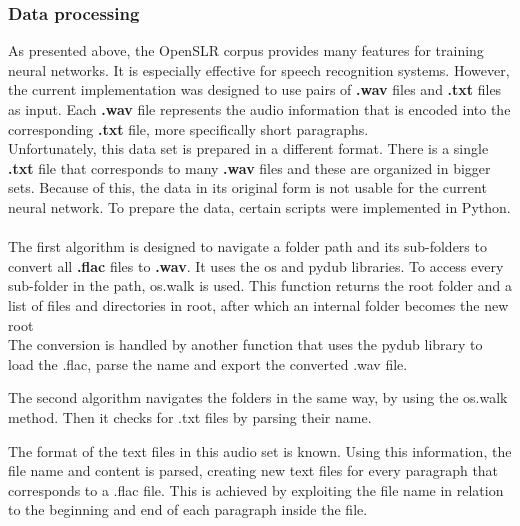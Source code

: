 \subsubsection{Data processing}
As presented above, the OpenSLR corpus provides many features for training neural networks. It is especially effective for speech recognition systems. However, the current implementation was designed to use pairs of \textbf{.wav} files and \textbf{.txt} files as input. Each \textbf{.wav} file represents the audio information that is encoded into the corresponding \textbf{.txt} file, more specifically short paragraphs.\\
Unfortunately, this data set is prepared in a different format. There is a single \textbf{.txt} file that corresponds to many \textbf{.wav} files and these are organized in bigger sets. Because of this, the data in its original form is not usable for the current neural network. To prepare the data, certain scripts were implemented in Python.\\\\
The first algorithm is designed to navigate a folder path and its sub-folders to convert all \textbf{.flac} files to \textbf{.wav}. It uses the os and pydub libraries.
To access every sub-folder in the path, os.walk is used. This function returns the root folder and a list of files and directories in root, after which an internal folder becomes the new root\\


The conversion is handled by another function that uses the pydub library to load the .flac, parse the name and export the converted .wav file.



The second algorithm navigates the folders in the same way, by using the os.walk method. Then it checks for .txt files by parsing their name. 



The format of the text files in this audio set is known. Using this information, the file name and content is parsed, creating new text files for every paragraph that corresponds to a .flac file. This is achieved by exploiting the file name in relation to the beginning and end of each paragraph inside the file.
 
